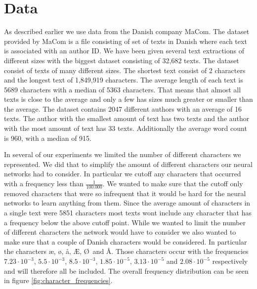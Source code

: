\section{Data} \label{sec:data}

As described earlier we use data from the Danish company MaCom. The dataset
provided by MaCom is a file consisting of set of texts in Danish where each text
is associated with an author ID. We have been given several text extractions
of different sizes with the biggest dataset consisting of 32,682 texts. The
dataset consist of texts of many different sizes. The shortest text consist of 2
characters and the longest text of 1,849,919 characters. The average length of
each text is 5689 characters with a median of 5363 characters. That means that
almost all texts is close to the average and only a few has sizes much greater
or smaller than the average. The dataset contains 2047 different authors with
an average of 16 texts. The author with the smallest amount of text has two
texts and the author with the most amount of text has 33 texts. Additionally the
average word count is 960, with a median of 915.

In several of our experiments we limited the number of different characters
we represented. We did that to simplify the amount of different characters
our neural networks had to consider. In particular we cutoff any characters
that occurred with a frequency less than $\frac{1}{100.000}$. We wanted to
make sure that the cutoff only removed characters that were so infrequent
that it would be hard for the neural networks to learn anything from them.
Since the average amount of characters in a single text were 5851 characters
most texts wont include any character that has a frequency below the above
cutoff point. While we wanted to limit the number of different characters
the network would have to consider we also wanted to make sure that a couple
of Danish characters would be considered. In particular the characters \ae,
\o, \aa, \AE, \O\ and \AA. Those characters occur with the frequencies
$7.23\cdot10^{-3}$, $5.5\cdot10^{-3}$, $8.5\cdot10^{-3}$, $1.85\cdot10^{-5}$,
$3.13\cdot10^{-5}$ and $2.08\cdot10^{-5}$ respectively and will therefore
all be included. The overall frequency distribution can be seen in figure
\ref{fig:character_frequencies}.

